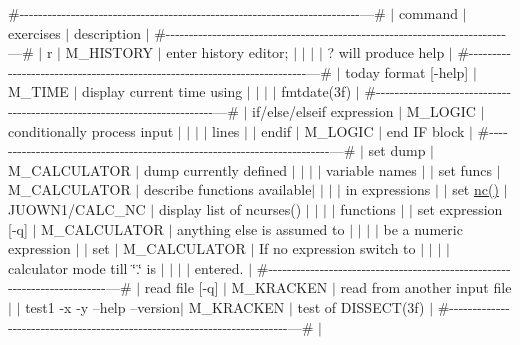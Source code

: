 \#-\/-\/-\/-\/-\/-\/-\/-\/-\/-\/-\/-\/-\/-\/-\/-\/-\/-\/-\/-\/-\/-\/-\/-\/-\/-\/-\/-\/-\/-\/-\/-\/-\/-\/-\/-\/-\/-\/-\/-\/-\/-\/-\/-\/-\/-\/-\/-\/-\/-\/-\/-\/-\/-\/-\/-\/-\/-\/-\/-\/-\/-\/-\/-\/-\/-\/-\/-\/-\/-\/-\/-\/-\/---\# $\vert$ command $\vert$exercises $\vert$ description $\vert$ \#-\/-\/-\/-\/-\/-\/-\/-\/-\/-\/-\/-\/-\/-\/-\/-\/-\/-\/-\/-\/-\/-\/-\/-\/-\/-\/-\/-\/-\/-\/-\/-\/-\/-\/-\/-\/-\/-\/-\/-\/-\/-\/-\/-\/-\/-\/-\/-\/-\/-\/-\/-\/-\/-\/-\/-\/-\/-\/-\/-\/-\/-\/-\/-\/-\/-\/-\/-\/-\/-\/-\/-\/-\/---\# $\vert$ r $\vert$ M\+\_\+\+H\+I\+S\+T\+O\+RY $\vert$ enter history editor; $\vert$ $\vert$ $\vert$ $\vert$ ? will produce help $\vert$ \#-\/-\/-\/-\/-\/-\/-\/-\/-\/-\/-\/-\/-\/-\/-\/-\/-\/-\/-\/-\/-\/-\/-\/-\/-\/-\/-\/-\/-\/-\/-\/-\/-\/-\/-\/-\/-\/-\/-\/-\/-\/-\/-\/-\/-\/-\/-\/-\/-\/-\/-\/-\/-\/-\/-\/-\/-\/-\/-\/-\/-\/-\/-\/-\/-\/-\/-\/-\/-\/-\/-\/-\/-\/---\# $\vert$ today format \mbox{[}-\/help\mbox{]} $\vert$ M\+\_\+\+T\+I\+ME $\vert$ display current time using $\vert$ $\vert$ $\vert$ $\vert$ fmtdate(3f) $\vert$ \#-\/-\/-\/-\/-\/-\/-\/-\/-\/-\/-\/-\/-\/-\/-\/-\/-\/-\/-\/-\/-\/-\/-\/-\/-\/-\/-\/-\/-\/-\/-\/-\/-\/-\/-\/-\/-\/-\/-\/-\/-\/-\/-\/-\/-\/-\/-\/-\/-\/-\/-\/-\/-\/-\/-\/-\/-\/-\/-\/-\/-\/-\/-\/-\/-\/-\/-\/-\/-\/-\/-\/-\/-\/---\# $\vert$ if/else/elseif expression $\vert$ M\+\_\+\+L\+O\+G\+IC $\vert$ conditionally process input $\vert$ $\vert$ $\vert$ $\vert$ lines $\vert$ $\vert$ endif $\vert$ M\+\_\+\+L\+O\+G\+IC $\vert$ end IF block $\vert$ \#-\/-\/-\/-\/-\/-\/-\/-\/-\/-\/-\/-\/-\/-\/-\/-\/-\/-\/-\/-\/-\/-\/-\/-\/-\/-\/-\/-\/-\/-\/-\/-\/-\/-\/-\/-\/-\/-\/-\/-\/-\/-\/-\/-\/-\/-\/-\/-\/-\/-\/-\/-\/-\/-\/-\/-\/-\/-\/-\/-\/-\/-\/-\/-\/-\/-\/-\/-\/-\/-\/-\/-\/-\/---\# $\vert$ set dump $\vert$ M\+\_\+\+C\+A\+L\+C\+U\+L\+A\+T\+OR $\vert$ dump currently defined $\vert$ $\vert$ $\vert$ $\vert$ variable names $\vert$ $\vert$ set funcs $\vert$ M\+\_\+\+C\+A\+L\+C\+U\+L\+A\+T\+OR $\vert$ describe functions available$\vert$ $\vert$ $\vert$ $\vert$ in expressions $\vert$ $\vert$ set \hyperlink{namespacem__calculator_a2ba30f3ed633dcbb2d8deeb54f8a450b}{nc()} $\vert$ J\+U\+O\+W\+N1/\+C\+A\+L\+C\+\_\+\+NC $\vert$ display list of ncurses() $\vert$ $\vert$ $\vert$ $\vert$ functions $\vert$ $\vert$ set expression \mbox{[}-\/q\mbox{]} $\vert$ M\+\_\+\+C\+A\+L\+C\+U\+L\+A\+T\+OR $\vert$ anything else is assumed to $\vert$ $\vert$ $\vert$ $\vert$ be a numeric expression $\vert$ $\vert$ set $\vert$ M\+\_\+\+C\+A\+L\+C\+U\+L\+A\+T\+OR $\vert$ If no expression switch to $\vert$ $\vert$ $\vert$ $\vert$ calculator mode till \char`\"{}.\char`\"{} is $\vert$ $\vert$ $\vert$ $\vert$ entered. $\vert$ \#-\/-\/-\/-\/-\/-\/-\/-\/-\/-\/-\/-\/-\/-\/-\/-\/-\/-\/-\/-\/-\/-\/-\/-\/-\/-\/-\/-\/-\/-\/-\/-\/-\/-\/-\/-\/-\/-\/-\/-\/-\/-\/-\/-\/-\/-\/-\/-\/-\/-\/-\/-\/-\/-\/-\/-\/-\/-\/-\/-\/-\/-\/-\/-\/-\/-\/-\/-\/-\/-\/-\/-\/-\/---\# $\vert$ read file \mbox{[}-\/q\mbox{]} $\vert$ M\+\_\+\+K\+R\+A\+C\+K\+EN $\vert$ read from another input file$\vert$ $\vert$ test1 -\/x -\/y --help --version$\vert$ M\+\_\+\+K\+R\+A\+C\+K\+EN $\vert$ test of D\+I\+S\+S\+E\+C\+T(3f) $\vert$ \#-\/-\/-\/-\/-\/-\/-\/-\/-\/-\/-\/-\/-\/-\/-\/-\/-\/-\/-\/-\/-\/-\/-\/-\/-\/-\/-\/-\/-\/-\/-\/-\/-\/-\/-\/-\/-\/-\/-\/-\/-\/-\/-\/-\/-\/-\/-\/-\/-\/-\/-\/-\/-\/-\/-\/-\/-\/-\/-\/-\/-\/-\/-\/-\/-\/-\/-\/-\/-\/-\/-\/-\/-\/---\# $\vert$ 